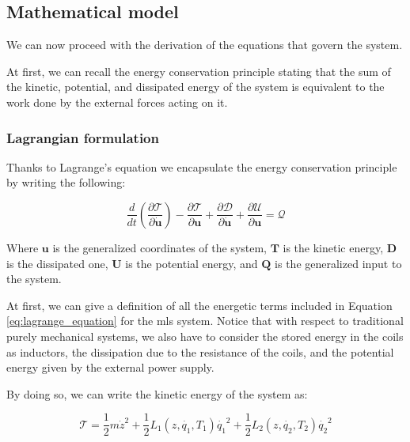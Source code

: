 \subsection{Mathematical model}
\label{subsec:mathematical_model}

We can now proceed with the derivation of the equations that govern the system.

At first, we can recall the energy conservation principle stating that the sum of the kinetic, potential, and dissipated energy of the system is equivalent to the work done by the external forces acting on it.



\subsubsection{Lagrangian formulation}
\label{subsubsec:lagrangian_formulation}

Thanks to Lagrange's equation we encapsulate the energy conservation principle by writing the following:

\begin{equation}
    \frac{d}{dt} \left( \frac{\partial \mathcal{T}}{\partial \dot{\mathbf{u}}} \right) - \frac{\partial \mathcal{T}}{\partial \mathbf{u}} + \frac{\partial \mathcal{D}}{\partial \dot{\mathbf{u}}} + \frac{\partial \mathcal{U}}{\partial \mathbf{u}} = \mathcal{Q}
    \label{eq:lagrange_equation}
\end{equation}

Where $\mathbf{u}$ is the generalized coordinates of the system, $\mathbf{T}$ is the kinetic energy, $\mathbf{D}$ is the dissipated one, $\mathbf{U}$ is the potential energy, and $\mathbf{Q}$ is the generalized input to the system.

At first, we can give a definition of all the energetic terms included in Equation \ref{eq:lagrange_equation} for the \acrshort{mls} system.
Notice that with respect to traditional purely mechanical systems, we also have to consider the stored energy in the coils as inductors, the dissipation due to the resistance of the coils, and the potential energy given by the external power supply.

By doing so, we can write the kinetic energy of the system as:

\begin{equation}
    \mathcal{T} = \frac{1}{2} m \dot{z}^2 + \frac{1}{2} L_1(z, \dot{q_1}, T_1) \dot{q_1}^2 + \frac{1}{2} L_2(z, \dot{q_2}, T_2) \dot{q_2}^2
    \label{eq:kinetic_energy}
\end{equation}

